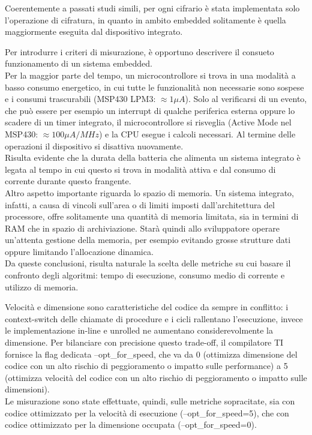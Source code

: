 \documentclass[target=bach,aauheader=,style=]{thud}
\begin{document}
	Coerentemente a passati studi simili,%
	per ogni cifrario è stata implementata solo l'operazione di cifratura, in quanto in ambito embedded solitamente è quella maggiormente eseguita dal dispositivo integrato.
	
	Per introdurre i criteri di misurazione, è opportuno descrivere il consueto funzionamento di un sistema embedded.\\
	Per la maggior parte del tempo, un microcontrollore si trova in una modalità a basso consumo energetico, in cui tutte le funzionalità non necessarie sono sospese e i consumi trascurabili (MSP430 LPM3: $\approx 1 \mu A$). Solo al verificarsi di un evento, che può essere per esempio un interrupt di qualche periferica esterna oppure lo scadere di un timer integrato, il microcontrollore si risveglia (Active Mode nel MSP430: $\approx 100 \mu A /MHz$) e la CPU esegue i calcoli necessari. Al termine delle operazioni il dispositivo si disattiva nuovamente.\\
	Risulta evidente che la durata della batteria che alimenta un sistema integrato è legata al tempo in cui questo si trova in modalità attiva e dal consumo di corrente durante questo frangente.\\
	Altro aspetto importante riguarda lo spazio di memoria. Un sistema integrato, infatti, a causa di vincoli sull'area o di limiti imposti dall'architettura del processore, offre solitamente una quantità di memoria limitata, sia in termini di RAM che in spazio di archiviazione. Starà quindi allo sviluppatore operare un'attenta gestione della memoria, per esempio evitando grosse strutture dati oppure limitando l'allocazione dinamica.\\
	Da queste conclusioni, risulta naturale la scelta delle metriche su cui basare il confronto degli algoritmi: tempo di esecuzione, consumo medio di corrente e utilizzo di memoria.
	
	Velocità e dimensione sono caratteristiche del codice da sempre in conflitto: i context-switch delle chiamate di procedure e i cicli rallentano l'esecuzione, invece le implementazione in-line e unrolled ne aumentano considerevolmente la dimensione. Per bilanciare con precisione questo trade-off, il compilatore TI fornisce la flag dedicata --opt\_for\_speed, che va da 0 (ottimizza dimensione del codice con un alto rischio di peggioramento o impatto sulle performance) a 5 (ottimizza velocità del codice con un alto rischio di peggioramento o impatto sulle dimensioni).\\
	Le misurazione sono state effettuate, quindi, sulle metriche sopracitate, sia con codice ottimizzato per la velocità di esecuzione (--opt\_for\_speed=5), che con codice ottimizzato per la dimensione occupata (--opt\_for\_speed=0).
	
\end{document}
